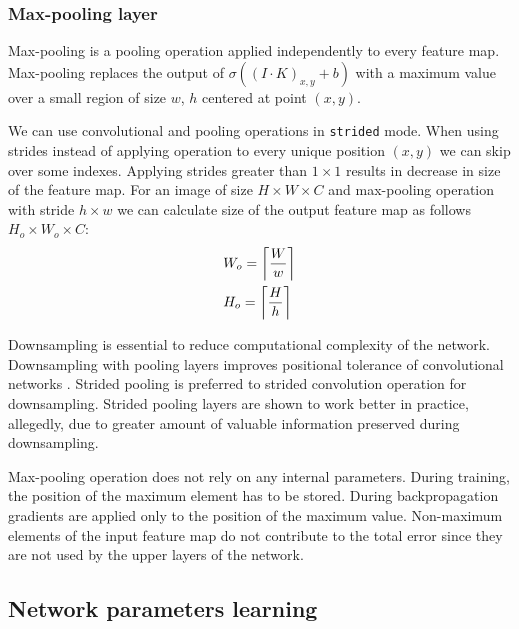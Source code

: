 \subsubsection{Max-pooling layer}

Max-pooling is a pooling operation applied independently to every feature map.
Max-pooling replaces the output of $\sigma((I \cdot K)_{x, y}+b)$ with a maximum value over a small region of size $w$, $h$ centered at point $(x,y)$.

We can use convolutional and pooling operations in \texttt{strided} mode. When using strides instead of applying operation to every unique position $(x, y)$ we can skip over some indexes. Applying strides greater than $1 \times 1$ results in decrease in size of the feature map. For an image of size $H \times W \times C$ and max-pooling operation with stride $h \times w$ we can calculate size of the output feature map as follows $H_o \times W_o \times C $:
\begin{equation*}
  \begin{aligned}
  & W_o = \ceil[\bigg]{\frac{W}{w}} \\
  & H_o = \ceil[\bigg]{\frac{H}{h}} \\
\end{aligned}
\end{equation*}

Downsampling is essential to reduce computational complexity of the network.
Downsampling with pooling layers improves positional tolerance of convolutional networks \cite{Scherer2010}.
Strided pooling is preferred to strided convolution operation for downsampling. Strided pooling layers are shown to work better in practice, allegedly, due to greater amount of valuable information preserved during downsampling.

Max-pooling operation does not rely on any internal parameters. During training, the position of the maximum element has to be stored. During backpropagation gradients are applied only to the position of the maximum value. Non-maximum elements of the input feature map do not contribute to the total error since they are not used by the upper layers of the network.

\subsection{Network parameters learning}
\label{ch:opt}


